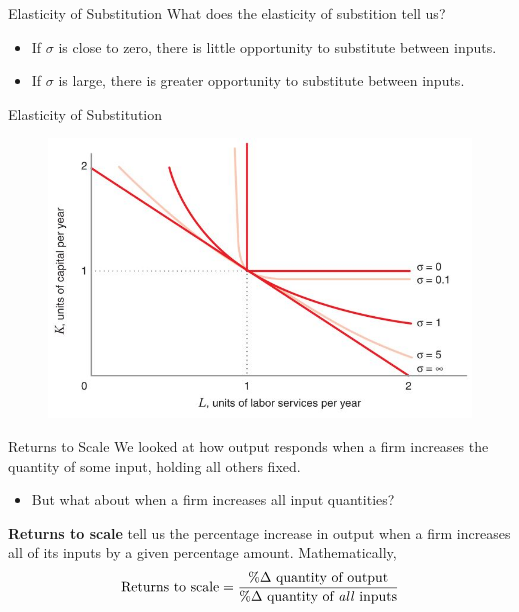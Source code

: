\documentclass[11pt,t]{beamer}
\begin{document}
\begin{frame}{Elasticity of Substitution}
  What does the elasticity of substition tell us?
  
  \bigskip
  \begin{itemize}
    \item If $\sigma$ is close to zero, there is little opportunity to substitute between inputs.

    \item If $\sigma$ is large, there is greater opportunity to substitute between inputs.
  \end{itemize}
\end{frame}

\begin{frame}{Elasticity of Substitution}
  \begin{figure}
    \includegraphics[width=\linewidth]{figures/fig6_17.jpg}
  \end{figure}
\end{frame}

\begin{frame}{Returns to Scale}
  We looked at how output responds when a firm increases the quantity of some input, holding all others fixed.
  
  \begin{itemize}
    \item But what about when a firm increases all input quantities?
  \end{itemize}
  
  \pause\bigskip
  \textbf{Returns to scale} tell us the percentage increase in output when a firm increases all of its inputs by a given percentage amount. Mathematically,
  \begin{equation*}
    \text{Returns to scale} = \frac{\% \Delta \text{ quantity of output}}{\% \Delta \text{ quantity of \textit{all} inputs}}
  \end{equation*}
\end{frame}
\end{document}

